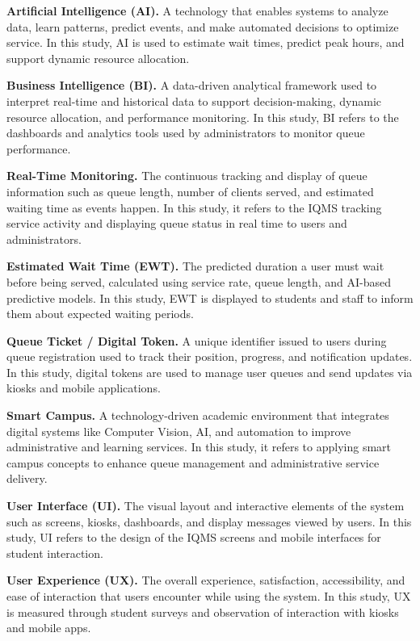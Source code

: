 \documentclass{research}
\begin{document}
\medskip
\indent\textbf{Artificial Intelligence (AI).} A technology that enables systems to analyze data, learn patterns, predict events, and make automated decisions to optimize service. In this study, AI is used to estimate wait times, predict peak hours, and support dynamic resource allocation.

\medskip
\indent\textbf{Business Intelligence (BI).} A data-driven analytical framework used to interpret real-time and historical data to support decision-making, dynamic resource allocation, and performance monitoring. In this study, BI refers to the dashboards and analytics tools used by administrators to monitor queue performance.

\medskip
\indent\textbf{Real-Time Monitoring.} The continuous tracking and display of queue information such as queue length, number of clients served, and estimated waiting time as events happen. In this study, it refers to the IQMS tracking service activity and displaying queue status in real time to users and administrators.

\medskip
\indent\textbf{Estimated Wait Time (EWT).} The predicted duration a user must wait before being served, calculated using service rate, queue length, and AI-based predictive models. In this study, EWT is displayed to students and staff to inform them about expected waiting periods.

\medskip
\indent\textbf{Queue Ticket / Digital Token.} A unique identifier issued to users during queue registration used to track their position, progress, and notification updates. In this study, digital tokens are used to manage user queues and send updates via kiosks and mobile applications.

\medskip
\indent\textbf{Smart Campus.} A technology-driven academic environment that integrates digital systems like Computer Vision, AI, and automation to improve administrative and learning services. In this study, it refers to applying smart campus concepts to enhance queue management and administrative service delivery.

\medskip
\indent\textbf{User Interface (UI).} The visual layout and interactive elements of the system such as screens, kiosks, dashboards, and display messages viewed by users. In this study, UI refers to the design of the IQMS screens and mobile interfaces for student interaction.

\medskip
\indent\textbf{User Experience (UX).} The overall experience, satisfaction, accessibility, and ease of interaction that users encounter while using the system. In this study, UX is measured through student surveys and observation of interaction with kiosks and mobile apps.
\end{document}
